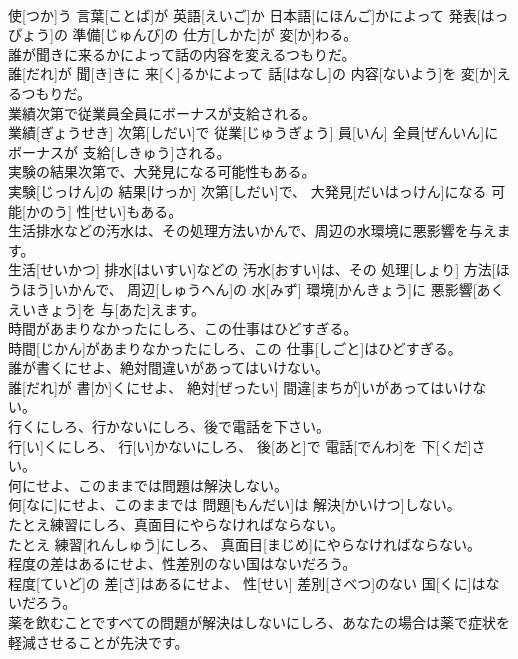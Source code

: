 \documentclass[8pt]{extreport}
\begin{document}
\begin{CJK}{UTF8}{min}
\\	使[つか]う 言葉[ことば]が 英語[えいご]か 日本語[にほんご]かによって 発表[はっぴょう]の 準備[じゅんび]の 仕方[しかた]が 変[か]わる。
\\	誰が聞きに来るかによって話の内容を変えるつもりだ。	
\\	誰[だれ]が 聞[き]きに 来[く]るかによって 話[はなし]の 内容[ないよう]を 変[か]えるつもりだ。
\\	業績次第で従業員全員にボーナスが支給される。	
\\	業績[ぎょうせき] 次第[しだい]で 従業[じゅうぎょう] 員[いん] 全員[ぜんいん]にボーナスが 支給[しきゅう]される。
\\	実験の結果次第で、大発見になる可能性もある。	
\\	実験[じっけん]の 結果[けっか] 次第[しだい]で、 大発見[だいはっけん]になる 可能[かのう] 性[せい]もある。
\\	生活排水などの汚水は、その処理方法いかんで、周辺の水環境に悪影響を与えます。	
\\	生活[せいかつ] 排水[はいすい]などの 汚水[おすい]は、その 処理[しょり] 方法[ほうほう]いかんで、 周辺[しゅうへん]の 水[みず] 環境[かんきょう]に 悪影響[あくえいきょう]を 与[あた]えます。
\\	時間があまりなかったにしろ、この仕事はひどすぎる。	
\\	時間[じかん]があまりなかったにしろ、この 仕事[しごと]はひどすぎる。
\\	誰が書くにせよ、絶対間違いがあってはいけない。	
\\	誰[だれ]が 書[か]くにせよ、 絶対[ぜったい] 間違[まちが]いがあってはいけない。
\\	行くにしろ、行かないにしろ、後で電話を下さい。	
\\	行[い]くにしろ、 行[い]かないにしろ、 後[あと]で 電話[でんわ]を 下[くだ]さい。
\\	何にせよ、このままでは問題は解決しない。	
\\	何[なに]にせよ、このままでは 問題[もんだい]は 解決[かいけつ]しない。
\\	たとえ練習にしろ、真面目にやらなければならない。	
\\	たとえ 練習[れんしゅう]にしろ、 真面目[まじめ]にやらなければならない。
\\	程度の差はあるにせよ、性差別のない国はないだろう。	
\\	程度[ていど]の 差[さ]はあるにせよ、 性[せい] 差別[さべつ]のない 国[くに]はないだろう。
\\	薬を飲むことですべての問題が解決はしないにしろ、あなたの場合は薬で症状を軽減させることが先決です。	

\end{CJK}
\end{document}
